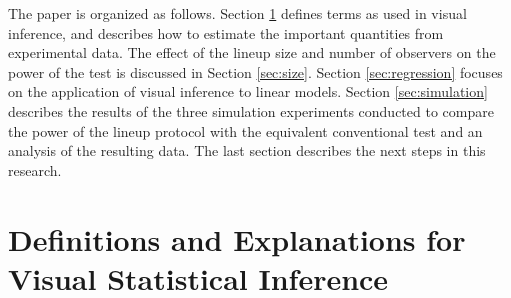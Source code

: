 \documentclass{article}
\newcommand{\blue}[1]{{\color{blue} #1}} %
\begin{document}





The paper is organized as follows. Section \ref{sec:visual_test} defines terms as used in visual inference, and describes how to estimate the important quantities from experimental data. The effect of the lineup size and number of observers on the power of the test is discussed in Section \ref{sec:size}. Section \ref{sec:regression} focuses on the application of  visual inference to linear models.  Section \ref{sec:simulation} describes the results of the three simulation experiments conducted to compare the power of the lineup protocol with the equivalent conventional test and an analysis of the resulting data. The last section describes the next steps in this research.


\section{Definitions and Explanations for Visual Statistical Inference} \label{sec:visual_test} 
\end{document}
